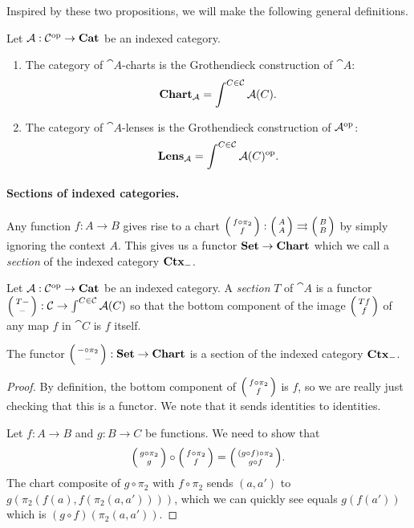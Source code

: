 \documentclass[DynamicalBook]{subfiles}
\begin{document}
Inspired by these two propositions, we will make the following general
definitions.
\begin{definition}
 Let $\mathcal{A} : \mathcal{C}^{\textnormal{op}} \to \textbf{Cat}$ be an indexed category.
 \begin{enumerate}
   \item The category of $\cat{A}$-charts is the Grothendieck construction of
     $\cat{A}$:
$$\textbf{Chart}_{\mathcal{A}} = \int^{C \in \mathcal{C}} \mathcal{A}(C).$$ 
\label{def.chart_general}
   \item The category of $\cat{A}$-lenses is the Grothendieck construction of
     $\mathcal{A}^{\textnormal{op}}$:
$$\textbf{Lens}_{\mathcal{A}} = \int^{C \in \mathcal{C}} \mathcal{A}(C)^{\textnormal{op}}.$$
\label{def.lens_general}
 \end{enumerate}
\end{definition}

\paragraph{Sections of indexed categories.}

Any function $f : A \to B$ gives rise to a chart $\lens{f \circ \pi_2}{f} :
\lens{A}{A} \tto \lens{B}{B}$ by simply ignoring the context $A$. This gives us
a functor $\textbf{Set} \to \textbf{Chart}$ which we call a \emph{section} of the
indexed category $\textbf{Ctx}_{-}$. 
\begin{definition}\label{def.section_of_indexed_category}
Let $\mathcal{A} : \mathcal{C}^{\textnormal{op}} \to \textbf{Cat}$ be an indexed category. A \emph{section} $T$ of
$\cat{A}$ is a functor $\lens{T-}{-} : \cat{C} \to \int^{C \in
  \cat{C}}\cat{A}(C)$ so that the bottom component of the image $\lens{Tf}{f}$
of any map $f$ in $\cat{C}$ is $f$ itself.
\end{definition}

\begin{proposition}\label{prop.section_charts_discrete}
The functor $\lens{-\circ \pi_2}{-} : \smset \to \Cat{Chart}$ is a section of
the indexed category $\textbf{Ctx}_{-}$.
\end{proposition}
\begin{proof}
By definition, the bottom component of $\lens{f \circ \pi_2}{f}$ is $f$, so we
are really just checking that this is a functor. We note that it sends
identities to identities.

Let $f :A \to B$ and $g : B \to C$ be functions. We need to show that
$$\lens{g \circ \pi_2}{g} \circ \lens{f \circ \pi_2}{f} = \lens{(g \circ f)
  \circ \pi_2}{g \circ f}.$$ 
The chart composite of $g \circ \pi_2$ with $f \circ \pi_2$ sends $(a, a')$ to
$g(\pi_2(f(a), f(\pi_2(a, a'))))$, which we can quickly see equals $g(f(a'))$ which
is $(g \circ f)(\pi_2(a, a'))$.
\end{proof}
\end{document}
